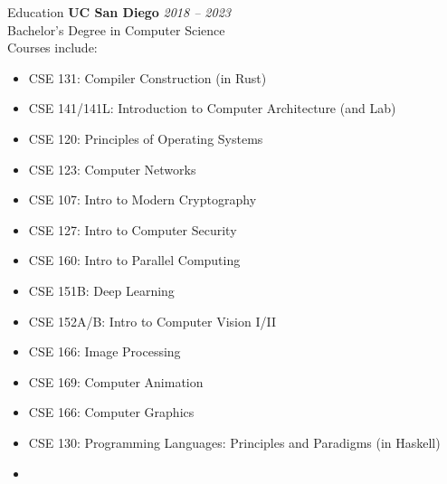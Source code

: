 

	\begin{rSection}{Education}
		{\bf UC San Diego} \hfill {\em 2018 -- 2023} 
		\\ Bachelor's Degree in Computer Science %
		\\ Courses include:
		\begin{multicols}{2}
			\begin{itemize}
				\item CSE 131: Compiler Construction (in Rust)
				\item CSE 141/141L: Introduction to Computer Architecture (and Lab)
				\item CSE 120: Principles of Operating Systems
				\item CSE 123: Computer Networks
				\item CSE 107: Intro to Modern Cryptography
				\item CSE 127: Intro to Computer Security
				\item CSE 160: Intro to Parallel Computing
				\item CSE 151B: Deep Learning
				\item CSE 152A/B: Intro to Computer Vision I/II
				\item CSE 166: Image Processing
				\item CSE 169: Computer Animation
				\item CSE 166: Computer Graphics
				\item CSE 130: Programming Languages: Principles and Paradigms (in Haskell)
				\item[\vspace{\fill}] %
			\end{itemize}
		\end{multicols}

	\end{rSection}
	
